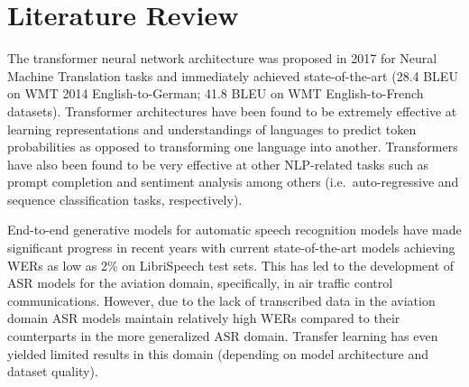 \documentclass[12pt]{article}
\begin{document}

\section{Literature Review}
The transformer neural network architecture was proposed in 2017 for Neural Machine Translation tasks and immediately achieved
state-of-the-art (28.4 BLEU on WMT 2014 English-to-German; 41.8 BLEU on WMT English-to-French datasets)\cite{vaswani_attention_2017}. Transformer
architectures have been found to be extremely effective at learning representations and understandings of languages to predict token probabilities as
opposed to transforming one language into another\cite{devlin_bert_2019,liu_roberta_2019}. Transformers have also been found to be very effective at
other NLP-related tasks such as prompt completion and sentiment analysis among others (i.e.~auto-regressive and sequence classification tasks,
respectively)\cite{lewis_bart_2019,radford_improving_2018}.


End-to-end generative models for automatic speech recognition models have made significant progress in recent years with current state-of-the-art
models achieving WERs as low as 2\% on LibriSpeech test sets\cite{han_contextnet_2020,kriman_quartznet_2020,baevski_wav2vec_2020,li_jasper_2019}.
This has led to the development of ASR models for the aviation domain, specifically, in air traffic control communications\cite{badrinath_automatic_2022,smidl_air_2019,zuluaga-gomez_automatic_2020,srinivasamurthy_semi-supervised_2017}. However, due to the lack of
transcribed data in the aviation domain\cite{zuluaga-gomez_automatic_2020,srinivasamurthy_semi-supervised_2017,badrinath_automatic_2022,smidl_air_2019}
ASR models maintain relatively high WERs compared to their counterparts in the more generalized ASR domain\cite{zuluaga-gomez_automatic_2020,badrinath_automatic_2022}. Transfer learning has even yielded limited results in this domain (depending on model
architecture and dataset quality)\cite{badrinath_automatic_2022,zuluaga-gomez_automatic_2020}.
\end{document}
